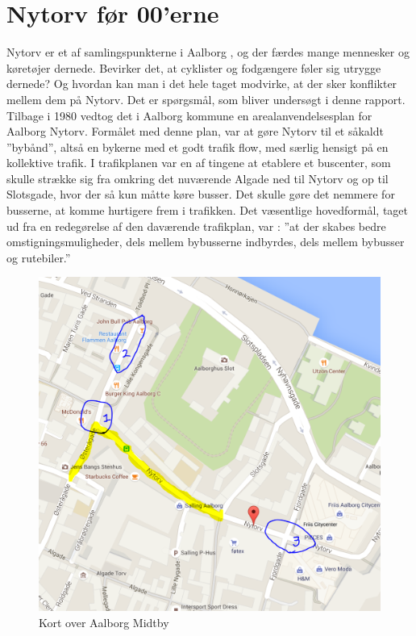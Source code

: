 \section{Nytorv før 00'erne}
\label{sec:nytorv_foer_null}
Nytorv er et af samlingspunkterne i Aalborg , og der færdes mange mennesker og køretøjer dernede. Bevirker det, at cyklister og fodgængere føler sig utrygge dernede? Og hvordan kan man i det hele taget modvirke, at der sker konflikter mellem dem på Nytorv. Det er spørgsmål, som bliver undersøgt i denne rapport.
Tilbage i 1980 vedtog det i Aalborg kommune en arealanvendelsesplan for Aalborg Nytorv. \autocite{Madsen2010}
Formålet med denne plan, var at gøre Nytorv til et såkaldt ”bybånd”, altså en bykerne med et godt trafik flow, med særlig hensigt på en kollektive trafik. I trafikplanen var en af tingene at etablere et buscenter, som skulle strække sig fra omkring det nuværende Algade ned til Nytorv og op til Slotsgade, hvor der så kun måtte køre busser. Det skulle gøre det nemmere for busserne, at komme hurtigere frem i trafikken. Det  væsentlige hovedformål, taget ud fra en redegørelse af den daværende trafikplan, var :
”at der skabes bedre omstigningsmuligheder, dels mellem bybusserne     indbyrdes, dels mellem bybusser og rutebiler.”
\begin{figure}
\centering
\includegraphics[scale=0.5]{figures/Billederogfigur/opserveringspunkter2.PNG}
\caption{Kort over Aalborg Midtby}
\end{figure}
